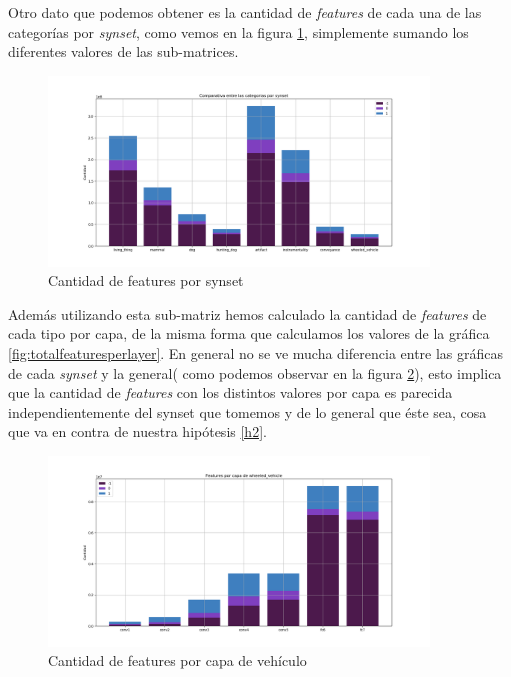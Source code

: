 \documentclass[12,twoside]{TFG-GM}
\theoremstyle{definition}
\theoremstyle{remark}
\begin{document}
Otro dato que podemos obtener es la cantidad de \textit{features} de cada una de las categorías por \textit{synset}, como vemos en la figura \ref{fig:totalfeaturespersynset}, simplemente sumando los diferentes valores de las sub-matrices. 


\begin{figure}[ht] 
	\centering
	\includegraphics[width=0.9\textwidth] {Images/plots/25/synsetslayer/Comparative_of_synsets_global.png}
	\caption{ Cantidad de features por synset
	\label{fig:totalfeaturespersynset}}
\end{figure}

Además utilizando esta sub-matriz hemos calculado la cantidad de \textit{features} de cada tipo por capa, de la misma forma que calculamos los valores de la gráfica \ref{fig:totalfeaturesperlayer}. En general no se ve mucha diferencia entre las gráficas de cada \textit{synset} y la general( como podemos observar en la figura \ref{fig:featuresperlayervehicle}), esto implica que la cantidad de \textit{features} con los distintos valores por capa es parecida independientemente del synset que tomemos y de lo general que éste sea, cosa que va en contra de nuestra hipótesis \ref{h2}.


\begin{figure}[ht] 
	\centering
	\includegraphics[width=0.9\textwidth] {Images/plots/25/synsetslayer/Comparative_of_synsets_wheeled_vehicle_global.png}
	\caption{ Cantidad de features por capa de vehículo
	\label{fig:featuresperlayervehicle}}
\end{figure}
\end{document}
